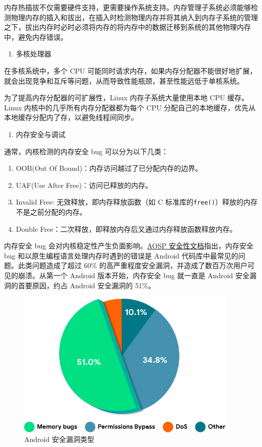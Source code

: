 \documentclass[AutoFakeBold]{LZUThesis}
\newcommand{\tightlist}{%
  \setlength{\itemsep}{0pt}\setlength{\parskip}{0pt}}
\begin{document}
\begin{sloppypar}
内存热插拔不仅需要硬件支持，更需要操作系统支持。内存管理子系统必须能够检测物理内存的插入和拔出，在插入时检测物理内存并将其纳入到内存子系统的管理之下，拔出内存时必时必须将内存的将内存中的数据迁移到系统的其他物理内存中，避免内存错误。

\begin{enumerate}
\def\labelenumi{\arabic{enumi}.}
\setcounter{enumi}{2}
\tightlist
\item
  多核处理器
\end{enumerate}

在多核系统中，多个 CPU
可能同时请求内存，如果内存分配器不能很好地扩展，就会出现竞争和互斥等问题，从而导致性能瓶颈，甚至性能远低于单核系统。

为了提高内存分配器的可扩展性，Linux 内存子系统大量使用本地 CPU
缓存。Linux 内核中的几乎所有内存分配器都为每个 CPU
分配自己的本地缓存，优先从本地缓存分配内了存，以避免线程间同步。

\begin{enumerate}
\def\labelenumi{\arabic{enumi}.}
\setcounter{enumi}{3}
\tightlist
\item
  内存安全与调试
\end{enumerate}

通常，内核检测的内存安全 bug 可以分为以下几类：

\begin{enumerate}
\def\labelenumi{\arabic{enumi}.}
\item
  OOB(Out Of Bound)：内存访问越过了已分配内存的边界。
\item
  UAF(Use After Free)：访问已释放的内存。
\item
  Invalid Free: 无效释放，即内存释放函数（如 C
  标准库的\texttt{free()}）释放的内存不是之前分配的内存。
\item
  Double Free：二次释放，即释放内存后又通过内存释放函数释放内存。
\end{enumerate}

内存安全 bug
会对内核稳定性产生负面影响。\href{https://source.android.google.cn/docs/security/memory-safety?hl=zh-cn}{AOSP
安全性文档}指出，内存安全 bug 和以原生编程语言处理内存时遇到的错误是
Android 代码库中最常见的问题。此类问题造成了超过 60\%
的高严重程度安全漏洞，并造成了数百万次用户可见的崩溃。从第一个 Android
版本开始，内存安全 bug 就一直是 Android 安全漏洞的首要原因，约占 Android
安全漏洞的 51\%。

\begin{figure}
\centering
\includegraphics[width=300pt]{images/Android-security-report.png}
\caption{Android 安全漏洞类型}
\end{figure}


\end{sloppypar}
\end{document}
